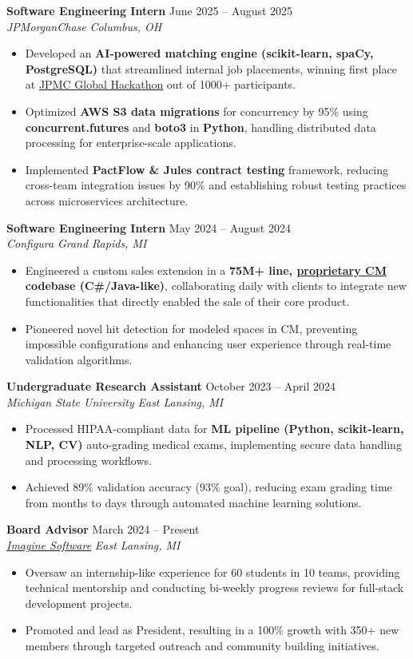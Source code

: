 \documentclass[letterpaper,11pt]{article}
\newcommand{\resumeItem}[1]{
  \item\small{
    {#1 \vspace{-2pt}}
  }
}
\newcommand{\resumeSubheading}[4]{
  \vspace{-2pt}\item
  \textbf{#1} \hfill #2 \\
  \textit{\small#3} \hfill \textit{\small #4} \\
  \vspace{-7pt} %
}
\newcommand{\resumeItemListStart}{\begin{itemize}}
\newcommand{\resumeItemListEnd}{\end{itemize}\vspace{-5pt}}
\begin{document}
    \resumeSubheading
      {Software Engineering Intern}{June 2025 -- August 2025}
      {JPMorganChase}{Columbus, OH}
    \resumeItemListStart
        \resumeItem{Developed an \textbf{AI-powered matching engine (scikit-learn, spaCy, PostgreSQL)} that streamlined internal job placements, winning first place at \underline{\href{https://www.linkedin.com/posts/indi-de-silva_at-jpmorganchase-our-internship-program-activity-7355579081490354177-NYLE}{JPMC Global Hackathon}} out of 1000+ participants.}
        \resumeItem{Optimized \textbf{AWS S3 data migrations} for concurrency by 95\% using \textbf{concurrent.futures} and \textbf{boto3} in \textbf{Python}, handling distributed data processing for enterprise-scale applications.}
        \resumeItem{Implemented \textbf{PactFlow \& Jules contract testing} framework, reducing cross-team integration issues by 90\% and establishing robust testing practices across microservices architecture.}
    \resumeItemListEnd

    \resumeSubheading
      {Software Engineering Intern}{May 2024 -- August 2024}
      {Configura}{Grand Rapids, MI}
      \resumeItemListStart
        \resumeItem{Engineered a custom sales extension in a \textbf{75M+ line, \href{https://support.configura.com/hc/en-us/articles/360048763074-Configura-Magic-Introduction-and-Code-Philosophy}{proprietary CM} codebase (C\#/Java-like)}, collaborating daily with clients to integrate new functionalities that directly enabled the sale of their core product.}
        \resumeItem{Pioneered novel hit detection for modeled spaces in CM, preventing impossible configurations and enhancing user experience through real-time validation algorithms.}
      \resumeItemListEnd

\resumeSubheading
      {Undergraduate Research Assistant}{October 2023 -- April 2024}
      {Michigan State University}{East Lansing, MI}
      \resumeItemListStart
        \resumeItem{Processed HIPAA-compliant data for \textbf{ML pipeline (Python, scikit-learn, NLP, CV)} auto-grading medical exams, implementing secure data handling and processing workflows.}
        \resumeItem{Achieved 89\% validation accuracy (93\% goal), reducing exam grading time from months to days through automated machine learning solutions.}
      \resumeItemListEnd

      \resumeSubheading
      {Board Advisor}{March 2024 -- Present}
      {\underline{\href{https://www.imagine-software.org/}{Imagine Software}}}{East Lansing, MI}
      \resumeItemListStart
        \resumeItem{Oversaw an internship-like experience for 60 students in 10 teams, providing technical mentorship and conducting bi-weekly progress reviews for full-stack development projects.}
        \resumeItem{Promoted and lead as President, resulting in a 100\% growth with 350+ new members through targeted outreach and community building initiatives.}
      \resumeItemListEnd
\end{document}
